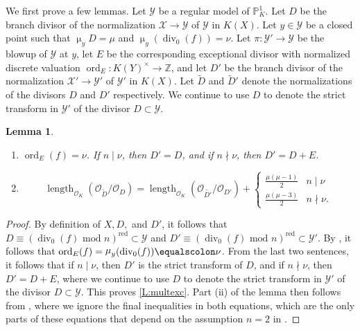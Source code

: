 \documentclass[12pt]{amsart}
\numberwithin{equation}{section}
\newtheorem{lemma}[equation]{Lemma}
\theoremstyle{definition}
\newcommand{\padma}[1]{{\color{Magenta} \sf $\clubsuit\clubsuit\clubsuit$ Padma: [#1]}}
\newcommand{\mc}[1]{\mathcal{#1}}
\newcommand{\Z}{\mathbb Z}
\renewcommand{\O}{\mathcal{O}}
\renewcommand{\P}{\mathbb P}
\DeclareMathOperator{\len}{length}
\renewcommand{\l}[2]{\len_{\O_K}(\mathcal{O}_{#1}/\mathcal{O}_{#2})}
\newcommand{\X}{\mathcal{X}}
\newcommand{\Y}{\mathcal{Y}}
\newcommand{\tx}[1]{\text{#1}}
\DeclareMathOperator{\divi}{div}
\DeclareMathOperator{\red}{red}
\DeclareMathOperator{\ord}{ord}
\DeclareMathOperator{\mult}{\mu}
\begin{document}
We first prove a few lemmas. Let $\Y$ be a regular model of $\P^1_K$. Let $D$ be the branch divisor of the normalization $\X\to\Y$ of $\Y$ in $K(X)$. Let $y\in\Y$ be a closed point such that $\mult_y D = \mu$ and $\mult_y (\divi_0(f)) = \nu$.
Let $\pi \colon \Y'\to\Y$ be the blowup of $\Y$ at $y$, let $E$ be the corresponding exceptional divisor with normalized discrete valuation $\ord_E \colon K(Y)^\times \rightarrow \Z$, and let $D'$ be the branch divisor of the normalization $\X'\to\Y'$ of $\Y'$ in $K(X)$. 
Let $\tilde{D}$ and $\tilde{D}'$ denote the normalizations of the divisors $D$ and $D'$ respectively. We continue to use $D$ to denote the strict transform in $\mc{Y}'$ of the divisor $D \subset\mc{Y}$.
\begin{lemma}\label{lemma: length change with blowup}
\hfill
\begin{enumerate}[\upshape (i)] 
\item\label{L:multexc} $\ord_E(f) = \nu$. If $n\mid\nu$, then $D'=D$, and if $n\nmid\nu$, then $D'=D+E$.
\item   \[\l{\tilde{D}}{D}=\l{\tilde{D'}}{D'}+\begin{cases}
        \frac{\mu(\mu-1)}{2}&n\mid\nu\\
        \frac{\mu(\mu-3)}{2}&n\nmid\nu.\end{cases}\]
\end{enumerate}
\end{lemma}
\begin{proof} By definition of $X, D,$ and $D'$, it follows that $D \equiv (\divi_0(f)\tx{ mod }n)^{\red}\subset \Y$ and $D' \equiv (\divi_0(f)\tx{ mod }n)^{\red}\subset\Y'$. By \cite[Proposition~9.2.23]{Liubook}, it follows that $\ord_E(f) = \mult_y (\divi_0(f)) \equalscolon \nu$.
From the last two sentences, it follows that if $n\mid\nu$, then $D'$ is the strict transform of $D$, and if $n\nmid\nu$, then $D'=D+E$, where we continue to use $D$ to denote the strict transform in $\mc{Y}'$ of the divisor $D \subset \mc{Y}$. This proves \ref{L:multexc}. Part (ii) of the lemma then follows from \cite[Equations (3.6) and (3.7)]{OShyper_published}, where we ignore the final inequalities in both equations, which are the only parts of these equations that depend on the assumption $n=2$ in \cite{OShyper_published}.   
\end{proof}
\end{document}
